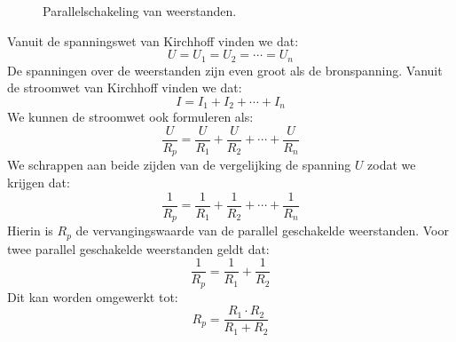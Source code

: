 \begin{figure}[!ht]
\centering
{}
\caption{Parallelschakeling van weerstanden.}
\label{fig:gelparalledschakelingweerstanden}
\end{figure}

Vanuit de spanningswet van Kirchhoff vinden we dat:
%
\begin{equation}
U = U_1 = U_2 = \cdots = U_n
\end{equation}
%
De spanningen over de weerstanden zijn even groot als de bronspanning.
Vanuit de stroomwet van Kirchhoff vinden we dat:
%
\begin{equation}
I = I_1 + I_2 + \cdots + I_n
\end{equation}
%
We kunnen de stroomwet ook formuleren als:
%
\begin{equation}
\dfrac{U}{R_p} = \dfrac{U}{R_1} + \dfrac{U}{R_2} + \cdots + \dfrac{U}{R_n}
\end{equation}
%
We schrappen aan beide zijden van de vergelijking de spanning $U$ zodat we krijgen dat:
%
\begin{equation}
\dfrac{1}{R_p} = \dfrac{1}{R_1} + \dfrac{1}{R_2} + \cdots + \dfrac{1}{R_n}
\end{equation}
%
Hierin is $R_p$ de vervangingswaarde van de parallel geschakelde weerstanden.
Voor twee parallel geschakelde weerstanden geldt dat:
\begin{equation}
\dfrac{1}{R_p} = \dfrac{1}{R_1} + \dfrac{1}{R_2}
\end{equation}
%
Dit kan worden omgewerkt tot:
\begin{equation}
R_p = \dfrac{R_1\cdot R_2}{R_1+R_2}
\end{equation}


